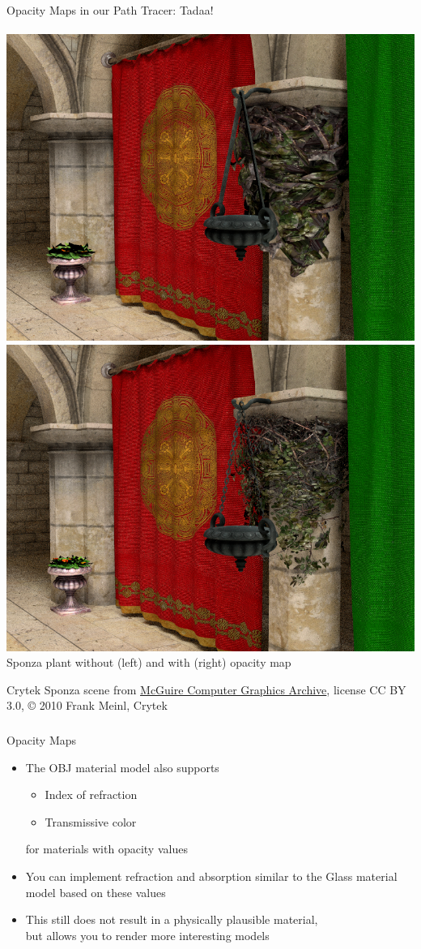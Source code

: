 \documentclass[utf8,stillsansserifmath,fleqn,t]{beamer}
\begin{document}
\begin{frame}[label=opacity-maps-2]
\frametitle{\insertsection}
Opacity Maps in our Path Tracer: Tadaa!\\~\\
\includegraphics[width=.49\textwidth]{./fig/opacitymap-sponza-without.png}\hfill
\includegraphics[width=.49\textwidth]{./fig/opacitymap-sponza-with.png}\\
Sponza plant without (left) and with (right) opacity map

\centerline{\tiny Crytek Sponza scene from
\href{https://casual-effects.com/data/}{McGuire Computer Graphics Archive},
license CC BY 3.0, \copyright{} 2010 Frank Meinl, Crytek}
\end{frame}

\begin{frame}
\frametitle{\insertsection}
Opacity Maps
\begin{itemize}
\item The OBJ material model also supports
    \begin{itemize}
    \item Index of refraction
    \item Transmissive color
    \end{itemize}
    for materials with opacity values
\item You can implement refraction and absorption similar to the Glass material
model based on these values
\item This still does not result in a physically plausible material,\\
but allows you to render more interesting models
\end{itemize}
\end{frame}
\end{document}
